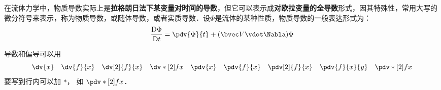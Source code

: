 
在流体力学中，物质导数实际上是\textbf{拉格朗日法下某变量对时间的导数}，但它可以表示成\textbf{对欧拉变量的全导数}形式，因其特殊性，常用大写的微分符号来表示，称为物质导数，或随体导数，或者实质导数．设$\Phi$是流体的某种性质，物质导数的一般表达形式为：
\begin{align}
\frac{\mathrm{D} \Phi }{\mathrm{D} t}=\pdv{\Phi}{t}+(\bvec V \vdot \Nabla)\Phi



\end{align}

导数和偏导可以用
\begin{equation}
\dv{x} \quad \dv{f}{x} \quad \dv[2]{f}{x} \quad \dv*[2]{f}{x} \quad
\pdv{x} \quad \pdv{f}{x} \quad \pdv[2]{f}{x} \quad \pdv{f}{x}{y} \quad \pdv*[2]{f}{x}
\end{equation}
要写到行内可以加 \verb|*|， 如 $\pdv*[2]{f}{x}$．